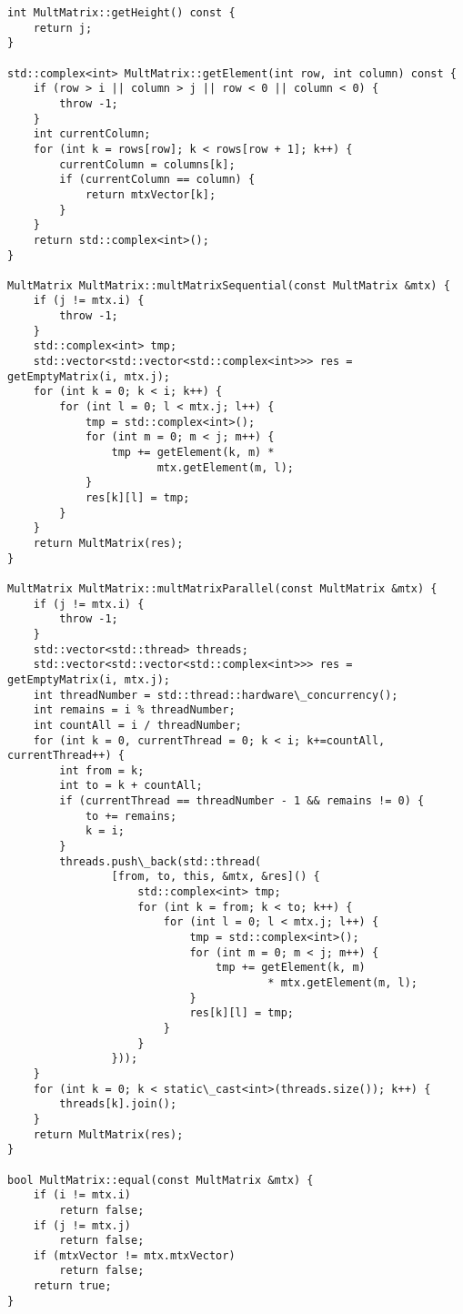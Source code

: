 \documentclass{report}
\begin{document}
\begin{lstlisting}
int MultMatrix::getHeight() const {
    return j;
}

std::complex<int> MultMatrix::getElement(int row, int column) const {
    if (row > i || column > j || row < 0 || column < 0) {
        throw -1;
    }
    int currentColumn;
    for (int k = rows[row]; k < rows[row + 1]; k++) {
        currentColumn = columns[k];
        if (currentColumn == column) {
            return mtxVector[k];
        }
    }
    return std::complex<int>();
}

MultMatrix MultMatrix::multMatrixSequential(const MultMatrix &mtx) {
    if (j != mtx.i) {
        throw -1;
    }
    std::complex<int> tmp;
    std::vector<std::vector<std::complex<int>>> res = getEmptyMatrix(i, mtx.j);
    for (int k = 0; k < i; k++) {
        for (int l = 0; l < mtx.j; l++) {
            tmp = std::complex<int>();
            for (int m = 0; m < j; m++) {
                tmp += getElement(k, m) *
                       mtx.getElement(m, l);
            }
            res[k][l] = tmp;
        }
    }
    return MultMatrix(res);
}

MultMatrix MultMatrix::multMatrixParallel(const MultMatrix &mtx) {
    if (j != mtx.i) {
        throw -1;
    }
    std::vector<std::thread> threads;
    std::vector<std::vector<std::complex<int>>> res = getEmptyMatrix(i, mtx.j);
    int threadNumber = std::thread::hardware\_concurrency();
    int remains = i % threadNumber;
    int countAll = i / threadNumber;
    for (int k = 0, currentThread = 0; k < i; k+=countAll, currentThread++) {
        int from = k;
        int to = k + countAll;
        if (currentThread == threadNumber - 1 && remains != 0) {
            to += remains;
            k = i;
        }
        threads.push\_back(std::thread(
                [from, to, this, &mtx, &res]() {
                    std::complex<int> tmp;
                    for (int k = from; k < to; k++) {
                        for (int l = 0; l < mtx.j; l++) {
                            tmp = std::complex<int>();
                            for (int m = 0; m < j; m++) {
                                tmp += getElement(k, m)
                                        * mtx.getElement(m, l);
                            }
                            res[k][l] = tmp;
                        }
                    }
                }));
    }
    for (int k = 0; k < static\_cast<int>(threads.size()); k++) {
        threads[k].join();
    }
    return MultMatrix(res);
}

bool MultMatrix::equal(const MultMatrix &mtx) {
    if (i != mtx.i)
        return false;
    if (j != mtx.j)
        return false;
    if (mtxVector != mtx.mtxVector)
        return false;
    return true;
}

\end{lstlisting}
\end{document}
